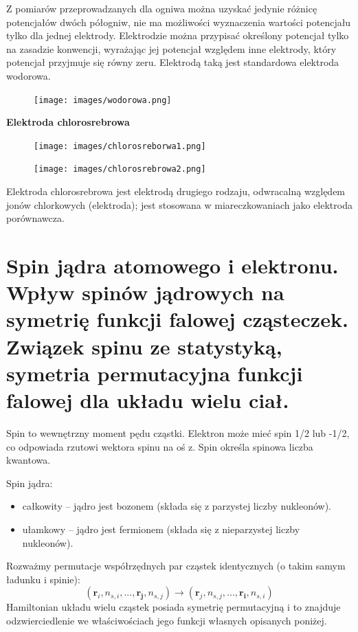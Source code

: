 \documentclass{article}
\begin{document}
Z pomiarów przeprowadzanych dla ogniwa można uzyskać jedynie różnicę potencjałów dwóch półogniw, nie ma możliwości wyznaczenia wartości potencjału tylko dla jednej elektrody. Elektrodzie można przypisać określony potencjał tylko na zasadzie konwencji, wyrażając jej potencjał względem inne elektrody, który potencjał przyjmuje się równy zeru. Elektrodą taką jest standardowa elektroda wodorowa. 
\begin{figure}[H]
    \centering
    \texttt{[image: images/wodorowa.png]}
\end{figure}

\textbf{Elektroda chlorosrebrowa}
\begin{figure}[H]
    \centering
    \texttt{[image: images/chlorosreborwa1.png]}
\end{figure}

\begin{figure}[H]
    \centering
    \texttt{[image: images/chlorosrebrowa2.png]}
\end{figure}

Elektroda chlorosrebrowa jest elektrodą drugiego rodzaju, odwracalną względem jonów chlorkowych (elektroda); jest stosowana w miareczkowaniach jako elektroda porównawcza.

\section{Spin jądra atomowego i elektronu. Wpływ spinów jądrowych na symetrię funkcji falowej cząsteczek. Związek spinu ze statystyką, symetria permutacyjna funkcji falowej dla układu wielu ciał.}
Spin to wewnętrzny moment pędu cząstki. Elektron może mieć spin 1/2 lub -1/2, co odpowiada rzutowi wektora spinu na oś z. Spin określa spinowa liczba kwantowa.

Spin jądra:
\begin{itemize}
    \item całkowity -- jądro jest bozonem (składa się z parzystej liczby nukleonów).
    \item ułamkowy -- jądro jest fermionem (składa się z nieparzystej liczby nukleonów).
\end{itemize}

Rozważmy permutacje współrzędnych par cząstek identycznych (o takim samym ładunku i spinie):
\begin{equation}
\label{permutacja}
    (\mathbf{r}_i, n_{s,i},...,\mathbf{r_j}, n_{s,j}) \rightarrow (\mathbf{r}_j, n_{s,j},...,\mathbf{r_i}, n_{s,i})
\end{equation}
Hamiltonian układu wielu cząstek posiada symetrię permutacyjną i to znajduje odzwierciedlenie we właściwościach jego funkcji własnych opisanych poniżej.
\end{document}
